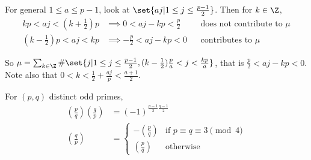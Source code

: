 \documentclass{article}
\newcommand{\legendre}[2]{\genfrac{(}{)}{}{}{#1}{#2}}
\begin{document}
For general $1 \leq a \leq p-1$, look at $\set{aj | 1 \leq j \leq \frac{p-1}{2}}$.
Then for $k \in \Z$,
\begin{align*}
    kp < aj < \left(k+ \frac{1}{2}\right) p &\implies 0 < aj - kp < \frac{p}{2} & &\text{does not contribute to $\mu$} \\
    \left(k-\frac{1}{2}\right)p < aj < kp &\implies -\frac{p}{2} < aj - kp < 0 & &\text{contributes to $\mu$}
\end{align*}

So $\mu = \sum_{k \in \Z} \#\set{j | 1 \leq j \leq \frac{p-1}{2}, (k-\frac{1}{2}) \frac{p}{a} < j < \frac{kp}{a}}$, that is $\frac{p}{2} < aj - kp < 0$.
Note also that $0 < k < \frac{1}{2} + \frac{a j}{p} < \frac{a+1}{2}$.

\begin{thm}\label{thm:qr}
    For $(p, q)$ distinct odd primes,
    \begin{align*}
        \legendre{p}{q} \legendre{q}{p} &= (-1)^{\frac{p-1}{2} \frac{q-1}{2}} \\
                        \legendre{q}{p} &=
                        \begin{cases}
                            -\legendre{p}{q} & \text{if } p \equiv q \equiv 3 \pmod{4} \\
                            \legendre{p}{q} & \text{otherwise}
                        \end{cases}
    \end{align*}
\end{thm}
\end{document}

